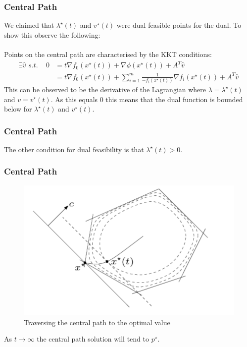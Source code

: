 \documentclass{beamer}
\begin{document}
\begin{frame}
    \frametitle{Central Path}
    We claimed that $\lambda^{\star}(t)$ and $v^{\star}(t)$ were dual feasible
    points for the dual. To show this observe the following:
    \\~\\
    Points on the central path are characterised by the KKT conditions:
    {\footnotesize
    \begin{align*}
        \exists \hat{v}\,\, s.t.  \, \, \,\, \, \, \,
        0 &= t\nabla f_{0}(x^{\star}(t)) + \nabla\phi(x^{\star}(t)) +
        A^{T}\hat{v} \\
        &= t \nabla f_{0}(x^{\star}(t)) +
        \sum\limits_{i=1}^{m}\frac{1}{-f_{i}(x^{\star}(t))}\nabla
        f_{i}(x^{\star}(t)) + A^{T}\hat{v}
    \end{align*}}
    This can be observed to be the derivative of the Lagrangian where $\lambda =
    \lambda^{\star}(t)$ and $v = v^{\star}(t)$. As this equals 0 this means that
    the dual function is bounded below for $\lambda^{\star}(t)$ and
    $v^{\star}(t)$.
\end{frame}

\begin{frame}
    \frametitle{Central Path}
    The other condition for dual feasibility is that $\lambda^{\star}(t) >
    0$.
\end{frame}


\begin{frame}
    \frametitle{Central Path}
    \begin{figure}[t]
        \centering
        \includegraphics[scale=0.25]{central_path}
        \caption{Traversing the central path to the optimal value}
        \label{fig:central path}
    \end{figure}
    \vspace{-5mm}
    As $t \rightarrow \infty$ the central path solution will tend to
    $p^{\star}$.
\end{frame}
\end{document}
